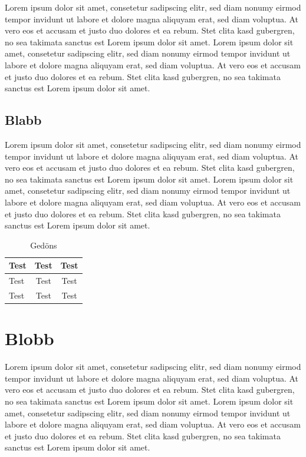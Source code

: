 \documentclass[twoside]{scrreprt}
\begin{document}
Lorem ipsum dolor sit amet, consetetur sadipscing elitr, sed diam nonumy eirmod tempor invidunt ut labore et dolore magna aliquyam erat, sed diam voluptua. At vero eos et accusam et justo duo dolores et ea rebum. Stet clita kasd gubergren, no sea takimata sanctus est Lorem ipsum dolor sit amet. Lorem ipsum dolor sit amet, consetetur sadipscing elitr, sed diam nonumy eirmod tempor invidunt ut labore et dolore magna aliquyam erat, sed diam voluptua. At vero eos et accusam et justo duo dolores et ea rebum. Stet clita kasd gubergren, no sea takimata sanctus est Lorem ipsum dolor sit amet.

\subsection{Blabb}
Lorem ipsum dolor sit amet, consetetur sadipscing elitr, sed diam nonumy eirmod tempor invidunt ut labore et dolore magna aliquyam erat, sed diam voluptua. At vero eos et accusam et justo duo dolores et ea rebum. Stet clita kasd gubergren, no sea takimata sanctus est Lorem ipsum dolor sit amet. Lorem ipsum dolor sit amet, consetetur sadipscing elitr, sed diam nonumy eirmod tempor invidunt ut labore et dolore magna aliquyam erat, sed diam voluptua. At vero eos et accusam et justo duo dolores et ea rebum. Stet clita kasd gubergren, no sea takimata sanctus est Lorem ipsum dolor sit amet.

\begin{table}[htbp]
  \begin{tabular}[c]{|l|cc|}
  	\hline
    Test & Test & Test\\
    \hline
    Test &     Test     & Test \\
    Test&Test&Test \\
    \hline
  \end{tabular}
  \caption{Gedöns}
\end{table}


\section{Blobb}
Lorem ipsum dolor sit amet, consetetur sadipscing elitr, sed diam nonumy eirmod tempor invidunt ut labore et dolore magna aliquyam erat, sed diam voluptua. At vero eos et accusam et justo duo dolores et ea rebum. Stet clita kasd gubergren, no sea takimata sanctus est Lorem ipsum dolor sit amet. Lorem ipsum dolor sit amet, consetetur sadipscing elitr, sed diam nonumy eirmod tempor invidunt ut labore et dolore magna aliquyam erat, sed diam voluptua. At vero eos et accusam et justo duo dolores et ea rebum. Stet clita kasd gubergren, no sea takimata sanctus est Lorem ipsum dolor sit amet.




\listoftables

\listoffigures


 
\end{document}
